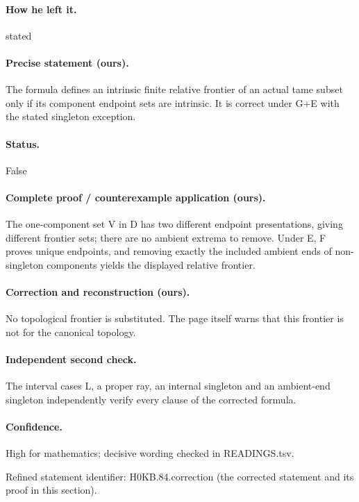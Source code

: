 \paragraph{How he left it.} stated

\paragraph{Precise statement (ours).} The formula defines an intrinsic finite relative frontier of an actual tame subset only if its component endpoint sets are intrinsic. It is correct under G+E with the stated singleton exception.

\paragraph{Status.} False

\paragraph{Complete proof / counterexample application (ours).} The one-component set V in D has two different endpoint presentations, giving different frontier sets; there are no ambient extrema to remove. Under E, F proves unique endpoints, and removing exactly the included ambient ends of non-singleton components yields the displayed relative frontier.

\paragraph{Correction and reconstruction (ours).} No topological frontier is substituted. The page itself warns that this frontier is not for the canonical topology.

\paragraph{Independent second check.} The interval cases L, a proper ray, an internal singleton and an ambient-end singleton independently verify every clause of the corrected formula.

\paragraph{Confidence.} High for mathematics; decisive wording checked in READINGS.tsv.

\noindent Refined statement identifier: H0KB.84.correction (the corrected statement and its proof in this section).

